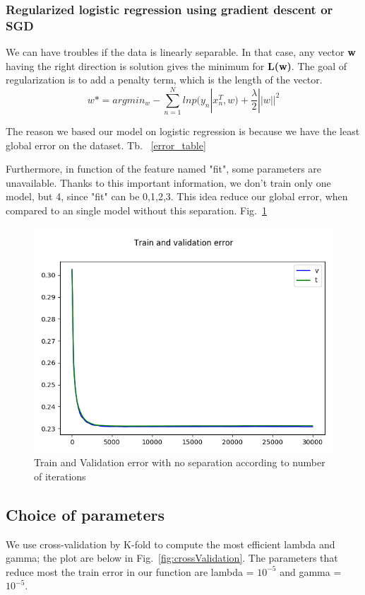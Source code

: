\documentclass[10pt,conference,compsocconf]{IEEEtran}
\begin{document}
	\subsubsection{Regularized logistic regression using gradient descent or SGD}
	We can have troubles if the data is linearly separable. In that case, any vector \textbf{w} having the right direction is solution gives the minimum for \textbf{L(w)}. The goal of regularization is to add a penalty term, which is the length of the vector.
	$$ w* = argmin_w - \sum\limits_{n=1}^N ln p(y_n|x_n^T, w) + \frac{\lambda}{2}||w||^2 $$
	
	
	The reason we based our model on logistic regression is because we have the least global error on the dataset. Tb. ~\ref{error_table}
	
	Furthermore, in function of the feature named "fit", some parameters are unavailable. Thanks to this important information, we don't train only one model, but 4, since "fit" can be {0,1,2,3}.
	This idea reduce our global error, when compared to an single model without this separation. Fig.~\ref{fig:noSepFunction}
	
	\begin{figure}[tbp]
		\centering
		\includegraphics[width=\columnwidth]{valid_train_error_with_thresh_no_jet.png}
		\caption{Train and Validation error with no separation according to number of iterations}
		\vspace{-3mm}
		\label{fig:noSepFunction}
	\end{figure}
	
	\subsection{Choice of parameters}
	We use cross-validation by K-fold to compute the most efficient lambda and gamma; the plot are below in Fig.~\ref{fig:crossValidation}. The parameters that reduce most the train error in our function are lambda = $10^{-5}$ and gamma = $10^{-5}$.
	
\end{document}
